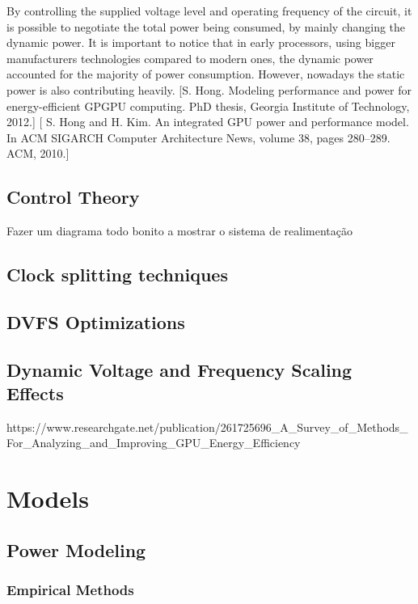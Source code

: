 By controlling the supplied voltage level and operating frequency of the circuit, it is possible to negotiate the total power being consumed, by mainly changing the dynamic power. It is important to notice that in early processors, using bigger manufacturers technologies compared to modern ones, the dynamic power accounted for the majority of power consumption. However,  nowadays the static power is also contributing heavily. [S. Hong. Modeling performance and power for energy-efficient GPGPU computing. PhD thesis, Georgia Institute of Technology, 2012.] [ S. Hong and H. Kim. An integrated GPU power and performance model. In ACM SIGARCH Computer Architecture News, volume 38, pages 280–289. ACM, 2010.]



\subsection{Control Theory}
Fazer um diagrama todo bonito a mostrar o sistema de realimentação

\subsection{Clock splitting techniques}

\subsection{DVFS Optimizations}



\subsection{Dynamic Voltage and Frequency Scaling Effects}
https://www.researchgate.net/publication/261725696_A_Survey_of_Methods_For_Analyzing_and_Improving_GPU_Energy_Efficiency




\section{Models}
\subsection{Power Modeling}
\label{section:powermodels}
\subsubsection{Empirical Methods}
